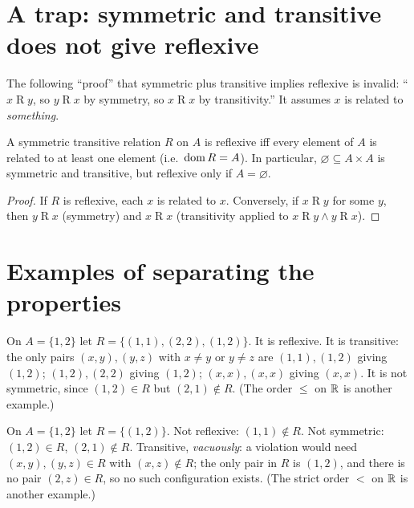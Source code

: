 \section{A trap: symmetric and transitive does not give reflexive}

The following ``proof'' that symmetric plus transitive implies reflexive is invalid: ``$x\mathrel Ry$, so $y\mathrel Rx$ by symmetry, so $x\mathrel Rx$ by transitivity.'' It assumes $x$ is related to \emph{something}.

\begin{proposition}
	A symmetric transitive relation $R$ on $A$ is reflexive iff every element of $A$ is related to at least one element (i.e.\ $\operatorname{dom} R=A$). In particular, $\varnothing\subseteq A\times A$ is symmetric and transitive, but reflexive only if $A=\varnothing$.
\end{proposition}
\begin{proof}
	If $R$ is reflexive, each $x$ is related to $x$. Conversely, if $x\mathrel Ry$ for some $y$, then $y\mathrel Rx$ (symmetry) and $x\mathrel Rx$ (transitivity applied to $x\mathrel Ry\wedge y\mathrel Rx$).
\end{proof}

\section{Examples of separating the properties}

\begin{example}\label{ex:refl-trans}
	On $A=\{1,2\}$ let $R=\{(1,1),(2,2),(1,2)\}$. It is reflexive. It is transitive: the only pairs $(x,y),(y,z)$ with $x\ne y$ or $y\ne z$ are $(1,1),(1,2)$ giving $(1,2)$; $(1,2),(2,2)$ giving $(1,2)$; $(x,x),(x,x)$ giving $(x,x)$. It is not symmetric, since $(1,2)\in R$ but $(2,1)\notin R$. (The order $\le$ on $\mathbb{R}$ is another example.)
\end{example}

\begin{example}\label{ex:trans-only}
	On $A=\{1,2\}$ let $R=\{(1,2)\}$. Not reflexive: $(1,1)\notin R$. Not symmetric: $(1,2)\in R$, $(2,1)\notin R$. Transitive, \emph{vacuously}: a violation would need $(x,y),(y,z)\in R$ with $(x,z)\notin R$; the only pair in $R$ is $(1,2)$, and there is no pair $(2,z)\in R$, so no such configuration exists. (The strict order $<$ on $\mathbb{R}$ is another example.)
\end{example}

